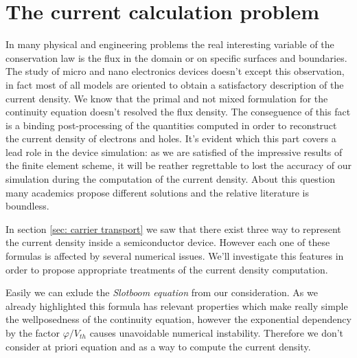 \chapter{The current calculation problem}

In many physical and engineering problems the real interesting variable of the conservation law is the flux in the domain or on specific surfaces and boundaries. The study of micro and nano electronics devices doesn't except this observation, in fact most of all models are oriented to obtain a satisfactory description of the current density.
 We know that the primal and not mixed formulation for  the continuity equation doesn't resolved  the flux density. The conseguence of this fact is a binding post-processing of the quantities computed in order to reconstruct the current density of electrons and holes.
It's evident which this part covers a lead role in the device simulation: 
as we are satisfied of the impressive results of the finite element scheme, it will be reather regrettable to lost the accuracy of our simulation during the computation of the current density.
About this question many academics propose different solutions and  the relative literature is boundless.
 
 
 
In section \ref{sec: carrier transport} we saw that there exist three way to represent the current density inside a semiconductor device. However each one of these formulas is affected by several numerical issues. We'll investigate this features in order to propose appropriate treatments of the current density computation.

Easily we can exlude the \textit{Slotboom equation} from our consideration. As we already highlighted this formula has relevant properties which make really simple the wellposedness of the continuity equation, however the exponential dependency by the factor $\varphi / V_{th}$ causes unavoidable numerical instability. Therefore we don't consider at priori equation  and  as a way to compute the current density.

